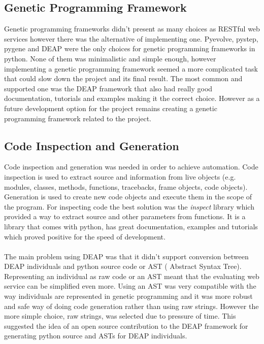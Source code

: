 \subsection{Genetic Programming Framework}
Genetic programming frameworks didn't present as many choices as RESTful web services however there was the alternative of implementing one.  Pyevolve\cite{pyevolve}, pystep\cite{pystep}, pygene\cite{pygene} and DEAP\cite{deap} were 
the only choices for genetic programming frameworks in python. None of them was minimalistic and simple enough, however implementing a genetic programming framework seemed a more complicated task
that could slow down the project and its final result. The most common and supported one was
the DEAP framework that also had really good documentation, tutorials and examples making it the correct choice. However as a future development option for the project
remains creating a genetic programming framework related to the project.
\subsection{Code Inspection and Generation}
Code inspection and generation was needed in order to achieve automation. Code inspection is used to extract source and information from live objects (e.g. modules, classes, methods, functions, tracebacks, 
frame objects, code objects). Generation is used to create new code objects and execute them in the scope of the program.
For inspecting code the best solution was the \textit{inspect} library which provided a way to extract source and other parameters from functions. It is a library that comes with python, 
has great documentation, examples and tutorials which proved positive for the speed of development.
\paragraph{}
The main problem using DEAP was that it didn't support conversion between DEAP individuals and python source code or AST ( Abstract Syntax Tree). Representing an individual as raw code or an AST meant that 
the evaluating web service can be simplified even more. Using an AST was very compatible with the way individuals are represented in genetic programming and it was more
robust and safe way of doing code generation rather than using raw strings. However the more simple choice, raw strings, was selected due to pressure of time.  This suggested the idea of an open source contribution to the DEAP framework
 for generating python source 
and ASTs for DEAP individuals.
